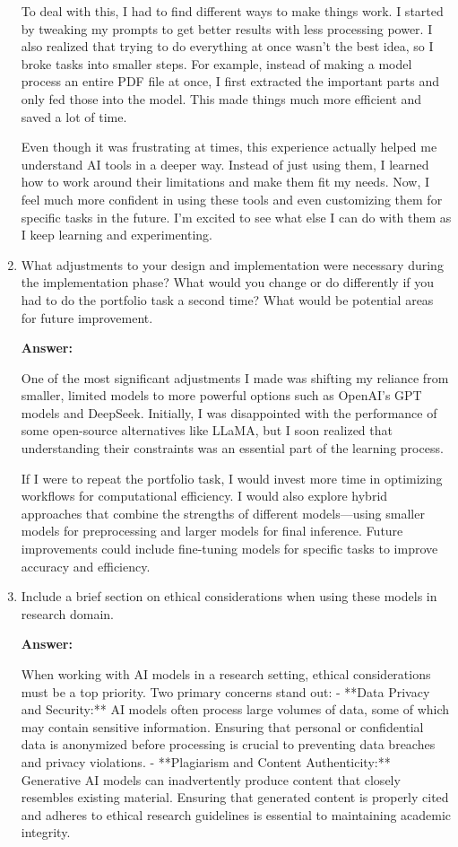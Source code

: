 \begin{enumerate}
To deal with this, I had to find different ways to make things work. I started by tweaking my prompts to get better results with less processing power. I also realized that trying to do everything at once wasn’t the best idea, so I broke tasks into smaller steps. For example, instead of making a model process an entire PDF file at once, I first extracted the important parts and only fed those into the model. This made things much more efficient and saved a lot of time.

Even though it was frustrating at times, this experience actually helped me understand AI tools in a deeper way. Instead of just using them, I learned how to work around their limitations and make them fit my needs. Now, I feel much more confident in using these tools and even customizing them for specific tasks in the future. I’m excited to see what else I can do with them as I keep learning and experimenting.

     \item What adjustments to your design and implementation were necessary during the implementation phase? What would you change or do differently if you had to do the portfolio task a second time? What would be potential areas for future improvement. 
    
     \textbf{Answer: }


One of the most significant adjustments I made was shifting my reliance from smaller, limited models to more powerful options such as OpenAI's GPT models and DeepSeek. Initially, I was disappointed with the performance of some open-source alternatives like LLaMA, but I soon realized that understanding their constraints was an essential part of the learning process.

If I were to repeat the portfolio task, I would invest more time in optimizing workflows for computational efficiency. I would also explore hybrid approaches that combine the strengths of different models—using smaller models for preprocessing and larger models for final inference. Future improvements could include fine-tuning models for specific tasks to improve accuracy and efficiency.


     \item Include a brief section on ethical considerations when using these models in research domain.
    
     \textbf{Answer: }


     When working with AI models in a research setting, ethical considerations must be a top priority. Two primary concerns stand out:
- **Data Privacy and Security:** AI models often process large volumes of data, some of which may contain sensitive information. Ensuring that personal or confidential data is anonymized before processing is crucial to preventing data breaches and privacy violations.
- **Plagiarism and Content Authenticity:** Generative AI models can inadvertently produce content that closely resembles existing material. Ensuring that generated content is properly cited and adheres to ethical research guidelines is essential to maintaining academic integrity.


\end{enumerate}
